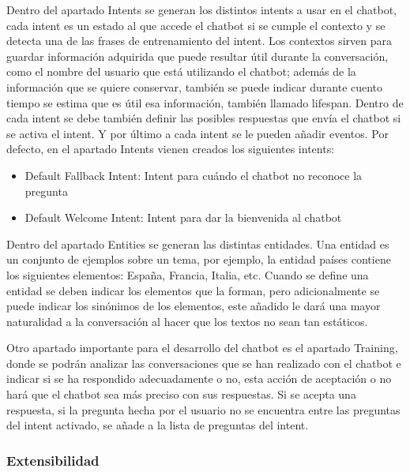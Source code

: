 Dentro del apartado Intents se generan los distintos intents a usar en el chatbot, cada intent es un estado al que accede el chatbot si se cumple el contexto y se detecta una de las frases de entrenamiento del intent. Los contextos sirven para guardar información adquirida que puede resultar útil durante la conversación, como el nombre del usuario que está utilizando el chatbot; además de la información que se quiere conservar, también se puede indicar durante cuento tiempo se estima que es útil esa información, también llamado lifespan. Dentro de cada intent se debe también definir las posibles respuestas que envía el chatbot si se activa el intent. Y por último a cada intent se le pueden añadir eventos. Por defecto, en el apartado Intents vienen creados los siguientes intents:

\begin{itemize}
\item Default Fallback Intent: Intent para cuándo el chatbot no reconoce la pregunta
\item Default Welcome Intent: Intent para dar la bienvenida al chatbot
\end{itemize}

Dentro del apartado Entities se generan las distintas entidades. Una entidad es un conjunto de ejemplos sobre un tema, por ejemplo, la entidad países contiene los siguientes elementos: España, Francia, Italia, etc. Cuando se define una entidad se deben indicar los elementos que la forman, pero adicionalmente se puede indicar los sinónimos de los elementos, este añadido le dará una mayor naturalidad a la conversación al hacer que los textos no sean tan estáticos.

Otro apartado importante para el desarrollo del chatbot es el apartado Training, donde se podrán analizar las conversaciones que se han realizado con el chatbot e indicar si se ha respondido adecuadamente o no, esta acción de aceptación o no hará que el chatbot sea más preciso con sus respuestas. Si se acepta una respuesta, si la pregunta hecha por el usuario no se encuentra entre las preguntas del intent activado, se añade a la lista de preguntas del intent.

\subsubsection*{Extensibilidad}

